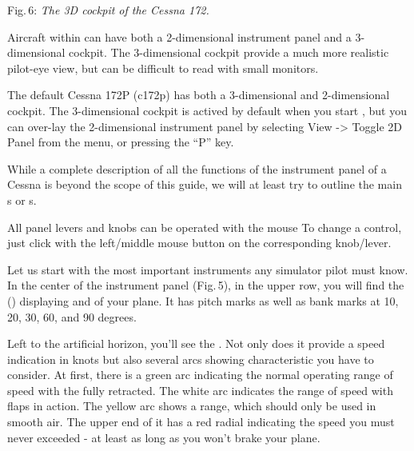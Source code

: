  \centerline{}

\smallskip
 \noindent
Fig.\,6: \textit{The 3D cockpit of the Cessna 172.}
\medskip

Aircraft within \FlightGear{} can have both a 2-dimensional instrument panel
and a 3-dimensional cockpit. The 3-dimensional cockpit provide a much
more realistic pilot-eye view, but can be difficult to read with small 
monitors.

The default Cessna 172P (c172p) has both a 3-dimensional and 2-dimensional
cockpit. The 3-dimensional cockpit is actived by default when you start 
\FlightGear{}, but you can over-lay the 2-dimensional instrument panel by 
selecting View -> Toggle 2D Panel from the menu, or pressing the ``P'' key.  

While a complete description of all the functions of the instrument panel 
of a Cessna is beyond the scope of this guide, we will at least try to outline 
the main s or s.

All panel levers and knobs can be operated with the mouse To change a
control, just click with the left/middle mouse button on the
corresponding knob/lever.

Let us start with the most important instruments any simulator pilot must know.
In the
center of the instrument panel (Fig.\,5), in the upper row, you will find the
 () displaying 
and
 of your plane. It has pitch marks as well as bank marks at 10, 20,
30, 60,
and 90 degrees.

Left to the artificial horizon, you'll see the . Not
only does
it provide a speed indication in knots but also several arcs showing
characteristic
 you have to consider. At first, there is a green arc
indicating
the normal operating range of speed with the  fully retracted. The
white arc
indicates the range of speed with flaps in action. The yellow arc shows a range,
which
should only be used in smooth air. The upper end of it has a red radial
indicating the
speed you must never exceeded - at least as long as you won't brake your plane.

